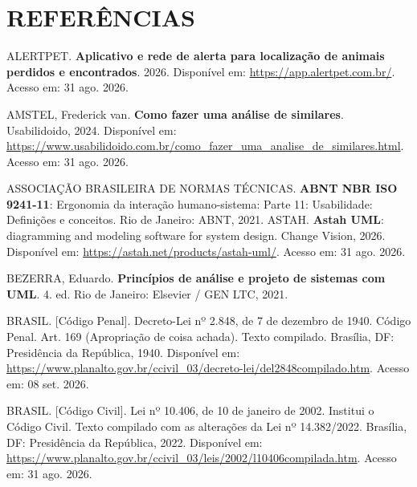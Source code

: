 \section*{REFERÊNCIAS}

\begin{flushleft}
\singlespacing

\vspace{12pt}
\noindent ALERTPET. \textbf{Aplicativo e rede de alerta para localização de animais perdidos e encontrados}. 2026. Disponível em: \url{https://app.alertpet.com.br/}. Acesso em: 31 ago. 2026.

\vspace{12pt}
\noindent AMSTEL, Frederick van. \textbf{Como fazer uma análise de similares}. Usabilidoido, 2024. Disponível em: \url{https://www.usabilidoido.com.br/como_fazer_uma_analise_de_similares.html}. Acesso em: 31 ago. 2026.

\vspace{12pt}
\noindent ASSOCIAÇÃO BRASILEIRA DE NORMAS TÉCNICAS. \textbf{ABNT NBR ISO 9241-11}: Ergonomia da interação humano-sistema: Parte 11: Usabilidade: Definições e conceitos. Rio de Janeiro: ABNT, 2021.
\vspace{12pt}
\noindent ASTAH. \textbf{Astah UML}: diagramming and modeling software for system design. Change Vision, 2026. Disponível em: \url{https://astah.net/products/astah-uml/}. Acesso em: 31 ago. 2026.

\vspace{12pt}
\noindent BEZERRA, Eduardo. \textbf{Princípios de análise e projeto de sistemas com UML}. 4. ed. Rio de Janeiro: Elsevier / GEN LTC, 2021.

\vspace{12pt}
\noindent BRASIL. [Código Penal]. Decreto-Lei nº 2.848, de 7 de dezembro de 1940. Código Penal. Art. 169 (Apropriação de coisa achada). Texto compilado. Brasília, DF: Presidência da República, 1940. Disponível em: \url{https://www.planalto.gov.br/ccivil_03/decreto-lei/del2848compilado.htm}. Acesso em: 08 set. 2026.

\vspace{12pt}
\noindent BRASIL. [Código Civil]. Lei nº 10.406, de 10 de janeiro de 2002. Institui o Código Civil. Texto compilado com as alterações da Lei nº 14.382/2022. Brasília, DF: Presidência da República, 2022. Disponível em: \url{https://www.planalto.gov.br/ccivil_03/leis/2002/l10406compilada.htm}. Acesso em: 31 ago. 2026.


\end{flushleft}
